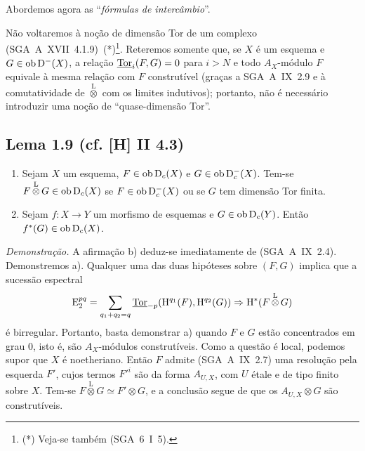 Abordemos agora as ``\emph{fórmulas de intercâmbio}''.

Não voltaremos à noção de dimensão Tor de um complexo (SGA~A~XVII~4.1.9)~(*)\footnote{(*) Veja-se também (SGA~6~I~5).}. Reteremos somente que, se $X$ é um esquema e $G \in \operatorname{ob} \mathrm{D}^{-}(X)$, a relação $\underline{\operatorname{Tor}}_i(F,G) = 0$ para $i > N$ e todo $A_X$-módulo $F$ equivale à mesma relação com $F$ construtível (graças a SGA~A~IX~2.9 e à comutatividade de $\mathop{\otimes}\limits^{\mathrm{L}}$ com os limites indutivos); portanto, não é necessário introduzir uma noção de ``quase-dimensão Tor''.

\subsection*{Lema 1.9 (cf. [H] II 4.3)}
\begin{enumerate}
\item[a)] Sejam $X$ um esquema, $F \in \operatorname{ob} \mathrm{D}_c(X)$ e $G \in \operatorname{ob} \mathrm{D}_c^{-}(X)$. Tem-se $F \mathop{\otimes}\limits^{\mathrm{L}} G \in \operatorname{ob} \mathrm{D}_c(X)$ se $F \in \operatorname{ob} \mathrm{D}_c^{-}(X)$ ou se $G$ tem dimensão Tor finita.
\item[b)] Sejam $f : X \to Y$ um morfismo de esquemas e $G \in \operatorname{ob} \mathrm{D}_c(Y)$. Então $f^{*}(G) \in \operatorname{ob} \mathrm{D}_c(X)$.
\end{enumerate}

\emph{Demonstração.} A afirmação b) deduz-se imediatamente de (SGA~A~IX~2.4). Demonstremos a). Qualquer uma das duas hipóteses sobre $(F,G)$ implica que a sucessão espectral
\[
\mathrm{E}_2^{pq} = \sum_{q_1+q_2=q} \underline{\operatorname{Tor}}_{-p}(\mathrm{H}^{q_1}(F), \mathrm{H}^{q_2}(G)) \Rightarrow \mathrm{H}^{*}(F \mathop{\otimes}\limits^{\mathrm{L}} G)
\]
é birregular. Portanto, basta demonstrar a) quando $F$ e $G$ estão concentrados em grau $0$, isto é, são $A_X$-módulos construtíveis. Como a questão é local, podemos supor que $X$ é noetheriano. Então $F$ admite (SGA~A~IX~2.7) uma resolução pela esquerda $F'$, cujos termos $F'^i$ são da forma $A_{U,X}$, com $U$ étale e de tipo finito sobre $X$. Tem-se $F \mathop{\otimes}\limits^{\mathrm{L}} G \simeq F' \otimes G$, e a conclusão segue de que os $A_{U,X} \otimes G$ são construtíveis.
